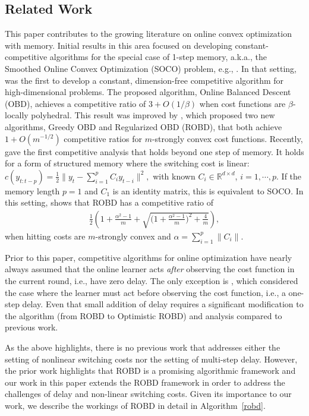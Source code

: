 \subsection{Related Work}
This paper contributes to the growing literature on online convex optimization with memory.  
Initial results in this area focused on developing constant-competitive algorithms for the special case of 1-step memory, a.k.a., the Smoothed Online Convex Optimization (SOCO) problem, e.g., \citep{chen2018smoothed,goel2019beyond}. In that setting, \citep{chen2018smoothed} was the first to develop a constant, dimension-free competitive algorithm for high-dimensional problems.  The proposed algorithm, Online Balanced Descent (OBD), achieves a competitive ratio of $3+O(1/\beta)$ when cost functions are $\beta$-locally polyhedral.  This result was improved by \citep{goel2019beyond}, which proposed two new algorithms, Greedy OBD and Regularized OBD (ROBD), that both achieve $1+O(m^{-1/2})$ competitive ratios for $m$-strongly convex cost functions.  Recently, \citep{shi2020online} gave the first competitive analysis that holds beyond one step of memory.  It holds for a form of structured memory where the switching cost is linear:
$
    c(y_{t:t-p})=\frac{1}{2}\|y_t-\sum_{i=1}^pC_iy_{t-i}\|^2,
$
with known $C_i\in\mathbb{R}^{d\times d}$, $i=1,\cdots,p$. If the memory length $p = 1$ and $C_1$ is an identity matrix, this is equivalent to SOCO. In this setting, \citep{shi2020online} shows that ROBD has a competitive ratio of 
\begin{align}
    \frac{1}{2}\left( 1 + \frac{\alpha^2 - 1}{m} + \sqrt{\Big( 1 + \frac{\alpha^2 - 1}{m}\Big)^2 + \frac{4}{m}} \right),
\end{align}
when hitting costs are $m$-strongly convex and $\alpha=\sum_{i=1}^p\|C_i\|$. 


Prior to this paper, competitive algorithms for online optimization have nearly always assumed that the online learner acts \emph{after} observing the cost function in the current round, i.e., have zero delay.  The only exception is \citep{shi2020online}, which considered the case where the learner must act before observing the cost function, i.e., a one-step delay.  Even that small addition of delay requires a significant modification to the algorithm (from ROBD to Optimistic ROBD) and analysis compared to previous work. 

As the above highlights, there is no previous work that addresses either the setting of nonlinear switching costs nor the setting of multi-step delay. However, the prior work highlights that ROBD is a promising algorithmic framework and our work in this paper extends the ROBD framework in order to address the challenges of delay and non-linear switching costs. Given its importance to our work, we describe the workings of ROBD in detail in Algorithm~\ref{robd}. 

